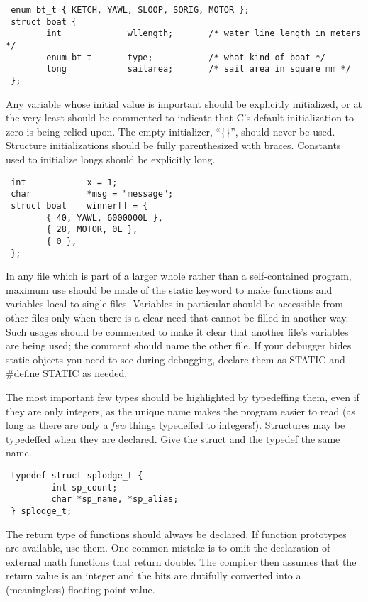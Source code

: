 \begin{verbatim}
 enum bt_t { KETCH, YAWL, SLOOP, SQRIG, MOTOR };
 struct boat {
        int             wllength;       /* water line length in meters */
        enum bt_t       type;           /* what kind of boat */
        long            sailarea;       /* sail area in square mm */
 };
\end{verbatim}

 Any variable whose initial value is important should be explicitly
initialized, or at the very least should be commented to indicate that C's
default initialization to zero is being relied upon. The empty initializer,
``\{\}'', should never be used. Structure initializations should be fully
parenthesized with braces. Constants used to initialize longs should be
explicitly long. 

\begin{verbatim}
 int            x = 1;
 char           *msg = "message";
 struct boat    winner[] = {
        { 40, YAWL, 6000000L },
        { 28, MOTOR, 0L },
        { 0 },
 }; 
\end{verbatim}

 In any file which is part of a larger whole rather than a self-contained
program, maximum use should be made of the static keyword to make functions and
variables local to single files.
Variables in particular should be accessible from other files only when there
is a clear need that cannot be filled in another way. Such usages should be
commented to make it clear that another file's variables are being used; the
comment should name the other file. If your debugger hides static objects you
need to see during debugging, declare them as STATIC and \#define STATIC as
needed. 

 The most important few types should be highlighted by typedeffing them, even
if they are only integers, as the unique name makes the program easier to read
(as long as there are only a {\em few} things typedeffed to integers!).
Structures may be typedeffed when they are declared. Give the struct and
the typedef the same name. 

\begin{verbatim}
 typedef struct splodge_t {
         int sp_count;
         char *sp_name, *sp_alias;
 } splodge_t; 
\end{verbatim}

 The return type of functions should always be declared. If function prototypes
are available, use them. One common mistake is to omit the declaration of
external math functions that return double. The compiler then assumes that the
return value is an integer and the bits are dutifully converted into a
(meaningless) floating point value. 
\newpage
